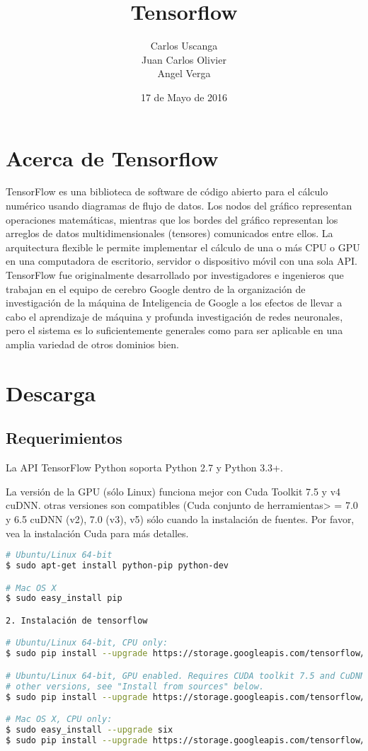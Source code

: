 \documentclass[11pt]{article}
\title{\textbf{Tensorflow}}
\author{Carlos Uscanga\\
		Juan Carlos Olivier\\
		Angel Verga}
\date{17 de Mayo de 2016}
\begin{document}
\maketitle

\section{Acerca de Tensorflow}
TensorFlow es una biblioteca de software de código abierto para el cálculo numérico usando diagramas de flujo de datos. Los nodos del gráfico representan operaciones matemáticas, mientras que los bordes del gráfico representan los arreglos de datos multidimensionales (tensores) comunicados entre ellos. La arquitectura flexible le permite implementar el cálculo de una o más CPU o GPU en una computadora de escritorio, servidor o dispositivo móvil con una sola API. TensorFlow fue originalmente desarrollado por investigadores e ingenieros que trabajan en el equipo de cerebro Google dentro de la organización de investigación de la máquina de Inteligencia de Google a los efectos de llevar a cabo el aprendizaje de máquina y profunda investigación de redes neuronales, pero el sistema es lo suficientemente generales como para ser aplicable en una amplia variedad de otros dominios bien.

\section{Descarga}
\subsection{Requerimientos}
La API TensorFlow Python soporta Python 2.7 y Python 3.3+.

La versión de la GPU (sólo Linux) funciona mejor con Cuda Toolkit 7.5 y v4 cuDNN. otras versiones son compatibles (Cuda conjunto de herramientas> = 7.0 y 6.5 cuDNN (v2), 7.0 (v3), v5) sólo cuando la instalación de fuentes. Por favor, vea la instalación Cuda para más detalles.

\begin{lstlisting}[language=bash]
# Ubuntu/Linux 64-bit
$ sudo apt-get install python-pip python-dev

# Mac OS X
$ sudo easy_install pip

2. Instalación de tensorflow

# Ubuntu/Linux 64-bit, CPU only:
$ sudo pip install --upgrade https://storage.googleapis.com/tensorflow/linux/cpu/tensorflow-0.8.0-cp27-none-linux_x86_64.whl

# Ubuntu/Linux 64-bit, GPU enabled. Requires CUDA toolkit 7.5 and CuDNN v4.  For
# other versions, see "Install from sources" below.
$ sudo pip install --upgrade https://storage.googleapis.com/tensorflow/linux/gpu/tensorflow-0.8.0-cp27-none-linux_x86_64.whl

# Mac OS X, CPU only:
$ sudo easy_install --upgrade six
$ sudo pip install --upgrade https://storage.googleapis.com/tensorflow/mac/tensorflow-0.8.0-py2-none-any.whl

\end{lstlisting}
\end{document}
